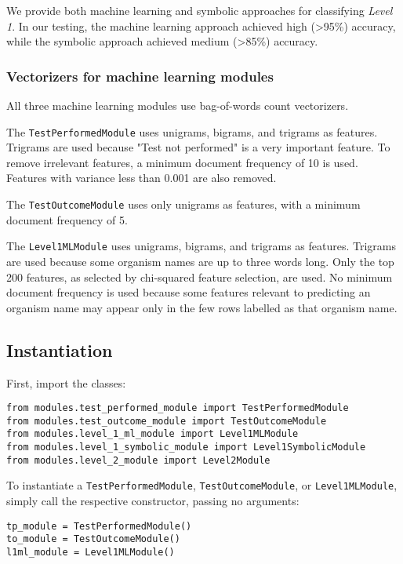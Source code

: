 \documentclass[a4paper]{article}
\begin{document}
We provide both machine learning and symbolic approaches for classifying \textit{Level 1}. In our testing, the machine learning approach achieved high (>95\%) accuracy, while the symbolic approach achieved medium (>85\%) accuracy.

\subsubsection{Vectorizers for machine learning modules}

All three machine learning modules use bag-of-words count vectorizers.

The \lstinline{TestPerformedModule} uses unigrams, bigrams, and trigrams as features. Trigrams are used because "Test not performed" is a very important feature. To remove irrelevant features, a minimum document frequency of 10 is used. Features with variance less than 0.001 are also removed.

The \lstinline{TestOutcomeModule} uses only unigrams as features, with a minimum document frequency of 5.

The \lstinline{Level1MLModule} uses unigrams, bigrams, and trigrams as features. Trigrams are used because some organism names are up to three words long. Only the top 200 features, as selected by chi-squared feature selection, are used. No minimum document frequency is used because some features relevant to predicting an organism name may appear only in the few rows labelled as that organism name.

\subsection{Instantiation}

First, import the classes:

\lstset{language=Python}
\begin{lstlisting}
from modules.test_performed_module import TestPerformedModule
from modules.test_outcome_module import TestOutcomeModule
from modules.level_1_ml_module import Level1MLModule
from modules.level_1_symbolic_module import Level1SymbolicModule
from modules.level_2_module import Level2Module
\end{lstlisting}
\lstset{language=}

To instantiate a \lstinline{TestPerformedModule}, \lstinline{TestOutcomeModule}, or \lstinline{Level1MLModule}, simply call the respective constructor, passing no arguments:

\lstset{language=Python}
\begin{lstlisting}
tp_module = TestPerformedModule()
to_module = TestOutcomeModule()
l1ml_module = Level1MLModule()
\end{lstlisting}
\lstset{language=}
\end{document}
